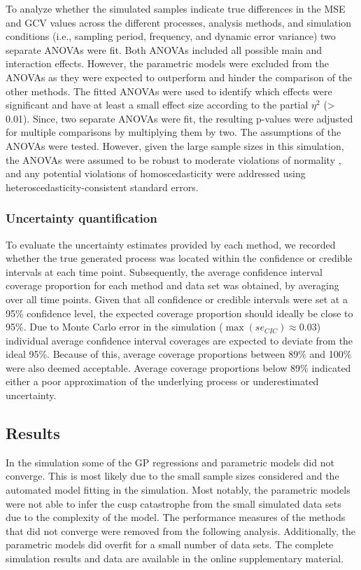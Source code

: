 \documentclass[man, floatsintext]{apa7}
\begin{document}
To analyze whether the simulated samples indicate true differences in the
MSE and GCV values across the different processes, analysis methods, and
simulation conditions (i.e., sampling period, frequency, and dynamic error
variance) two separate ANOVAs were fit. Both ANOVAs included all possible main
and interaction effects. However, the parametric models were excluded from
the ANOVAs as they were expected to outperform and hinder the comparison
of the other methods. The fitted ANOVAs were used to identify which effects
were significant and have at least a small effect size according to the partial
$\eta^2$ (> 0.01). Since, two separate ANOVAs were fit, the resulting p-values
were adjusted for multiple comparisons by multiplying them by two. The
assumptions of the ANOVAs were tested. However, given the large sample sizes in
this simulation, the ANOVAs were assumed to be robust to moderate violations of
normality \parencite{blanca_non-normal_2017}, and any potential violations of
homoscedasticity were addressed using heteroscedasticity-consistent standard
errors.

\subsubsection{Uncertainty quantification}

To evaluate the uncertainty estimates provided by each method, we recorded
whether the true generated process was located within the confidence or
credible intervals at each time point. Subsequently, the average confidence
interval coverage proportion for each method and data set was obtained, by
averaging over all time points. Given that all confidence or credible intervals
were set at a 95\% confidence level, the expected coverage proportion should
ideally be close to 95\%. Due to Monte Carlo error in the simulation
($\max(se_{CIC}) \approx 0.03$) individual average confidence interval
coverages are expected to deviate from the ideal 95\%. Because of this, average
coverage proportions between 89\% and 100\% were also deemed acceptable.
Average coverage proportions below 89\% indicated either a poor approximation
of the underlying process or underestimated uncertainty.

\subsection{Results}

In the simulation some of the GP regressions and parametric models did not
converge. This is most likely due to the small sample sizes considered and the
automated model fitting in the simulation. Most notably, the parametric models
were not able to infer the cusp catastrophe from the small simulated data sets
due to the complexity of the model. The performance measures of the methods
that did not converge were removed from the following analysis. Additionally,
the parametric models did overfit for a small number of data sets. The
complete simulation results and data are available in the online supplementary
material.
\end{document}
